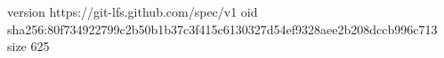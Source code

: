 version https://git-lfs.github.com/spec/v1
oid sha256:80f734922799c2b50b1b37c3f415c6130327d54ef9328aee2b208dccb996c713
size 625
